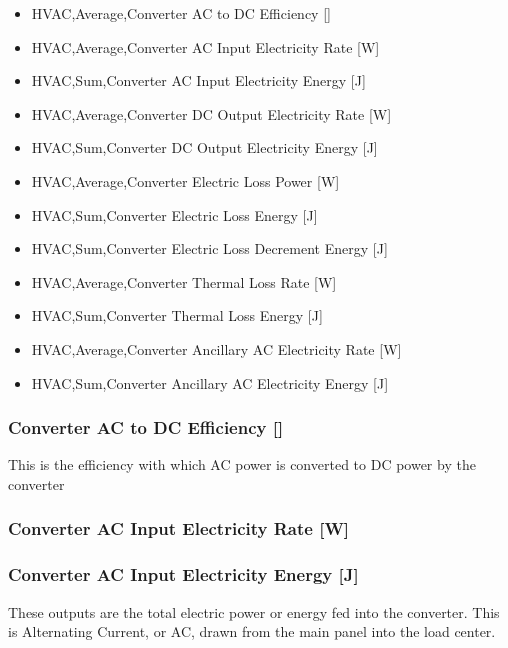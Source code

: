 \begin{itemize}
\tightlist
\item
  HVAC,Average,Converter AC to DC Efficiency {[]}
\item
  HVAC,Average,Converter AC Input Electricity Rate {[}W{]}
\item
  HVAC,Sum,Converter AC Input Electricity Energy {[}J{]}
\item
  HVAC,Average,Converter DC Output Electricity Rate {[}W{]}
\item
  HVAC,Sum,Converter DC Output Electricity Energy {[}J{]}
\item
  HVAC,Average,Converter Electric Loss Power {[}W{]}
\item
  HVAC,Sum,Converter Electric Loss Energy {[}J{]}
\item
  HVAC,Sum,Converter Electric Loss Decrement Energy {[}J{]}
\item
  HVAC,Average,Converter Thermal Loss Rate {[}W{]}
\item
  HVAC,Sum,Converter Thermal Loss Energy {[}J{]}
\item
  HVAC,Average,Converter Ancillary AC Electricity Rate {[}W{]}
\item
  HVAC,Sum,Converter Ancillary AC Electricity Energy {[}J{]}
\end{itemize}

\subsubsection{Converter AC to DC Efficiency {[]}}\label{converter-ac-to-dc-efficiency}

This is the efficiency with which AC power is converted to DC power by the converter

\subsubsection{Converter AC Input Electricity Rate {[}W{]}}\label{converter-ac-input-electric-power-w}

\subsubsection{Converter AC Input Electricity Energy {[}J{]}}\label{converter-ac-input-electric-energy-j}

These outputs are the total electric power or energy fed into the converter. This is Alternating Current, or AC, drawn from the main panel into the load center.

